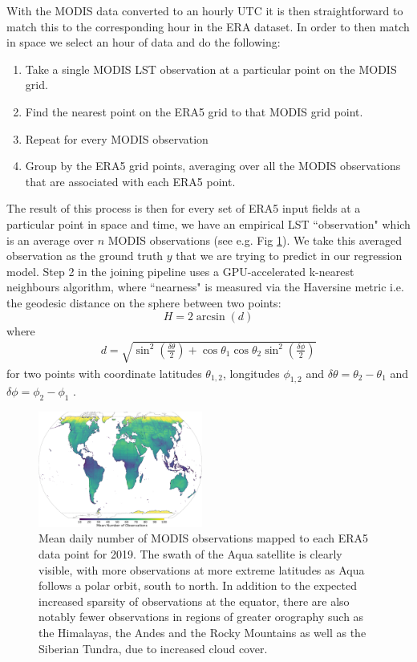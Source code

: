 \documentclass[twocolumn]{article}
\begin{document}
\noindent With the MODIS data converted to an hourly UTC it is then straightforward to match this to the corresponding hour in the ERA dataset. In order to then match in space we select an hour of data and do the following:
\begin{enumerate}
	\item Take a single MODIS LST observation at a particular point on the MODIS grid.
	\item Find the nearest point on the ERA5 grid to that MODIS grid point.
	\item Repeat for every MODIS observation
	\item Group by the ERA5 grid points, averaging over all the MODIS observations that are associated with each ERA5 point. 
\end{enumerate}
The result of this process is then for every set of ERA5 input fields at a particular point in space and time, we have an empirical LST ``observation" which is an average over $n$ MODIS observations (see e.g. Fig \ref{fig:MODIS_obs}). We take this averaged observation as the ground truth $y$ that we are trying to predict in our regression model.  Step 2 in the joining pipeline  uses a GPU-accelerated k-nearest neighbours algorithm\cite{Rapids}, where ``nearness" is measured via the Haversine metric i.e.  the geodesic distance on the sphere between two points: 
\begin{equation}
	H = 2 \arcsin (d)
\end{equation}
where
\begin{eqnarray}
	d = \sqrt{\sin^2\left(\frac{\delta\theta}{2}\right) + \cos \theta_1 \cos \theta_2 \sin^2\left(\frac{\delta \phi}{2}\right) }
\end{eqnarray} 
for two points with coordinate latitudes $\theta_{1,2}$, longitudes $\phi_{1,2}$ and $\delta \theta = \theta_2 - \theta_1$ and  $\delta \phi = \phi_2 - \phi_1$ . 
\begin{figure}
	\includegraphics[width=0.48\textwidth]{num_obs_map.png}
	\caption{Mean daily number of MODIS observations mapped to each ERA5 data point for 2019. The swath of the Aqua satellite is clearly visible, with more observations at more extreme latitudes as Aqua follows a polar orbit, south to north. In addition to the expected increased sparsity of observations at the equator, there are also notably fewer observations in regions of greater orography such as the Himalayas, the Andes and the  Rocky Mountains as well as the Siberian Tundra, due to increased cloud cover.} 
	\label{fig:MODIS_obs}
\end{figure}
\end{document}
